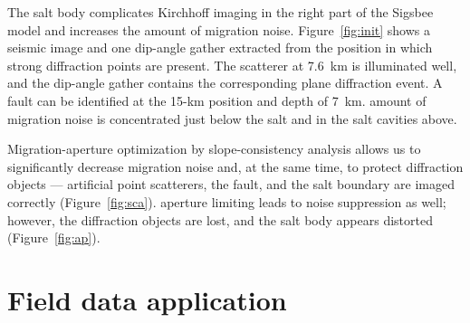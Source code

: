 

The salt body complicates Kirchhoff imaging in the right part of the Sigsbee model and increases the amount of migration noise.
Figure~\ref{fig:init} shows a seismic image and one dip-angle gather extracted from the position in which strong
diffraction points are present. The scatterer at 7.6~km is illuminated well, and the dip-angle gather contains the corresponding plane
diffraction event. A fault can be identified at the 15-km position and depth of 7~km.  amount of migration noise is concentrated just
below the salt and in the salt cavities above.

Migration-aperture optimization by slope-consistency analysis allows us to significantly decrease migration noise and, at the same time, 
to protect diffraction objects --- artificial point scatterers, the fault, and the salt boundary are  imaged correctly (Figure~\ref{fig:sca}). 
 aperture limiting leads to noise suppression as well; however, the diffraction objects are lost, and the salt body appears
distorted (Figure~\ref{fig:ap}).


\section{Field data application}

